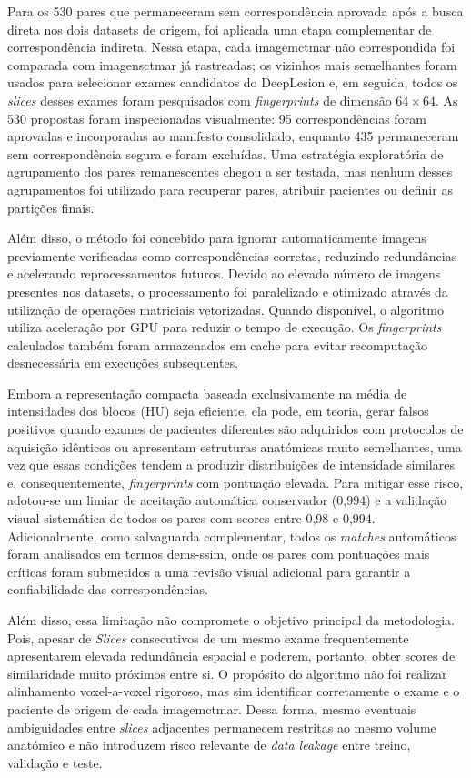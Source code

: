 Para os 530 pares que permaneceram sem correspondência aprovada após a busca direta nos dois datasets de origem, foi aplicada uma etapa complementar de correspondência indireta. Nessa etapa, cada imagem\acrshort{ctmar} não correspondida foi comparada com imagens\acrshort{ctmar} já rastreadas; os vizinhos mais semelhantes foram usados para selecionar exames candidatos do DeepLesion e, em seguida, todos os \textit{slices} desses exames foram pesquisados com \textit{fingerprints} de dimensão $64\times64$. As 530 propostas foram inspecionadas visualmente: 95 correspondências foram aprovadas e incorporadas ao manifesto consolidado, enquanto 435 permaneceram sem correspondência segura e foram excluídas. Uma estratégia exploratória de agrupamento dos pares remanescentes chegou a ser testada, mas nenhum desses agrupamentos foi utilizado para recuperar pares, atribuir pacientes ou definir as partições finais.

Além disso, o método foi concebido para ignorar automaticamente imagens previamente verificadas como correspondências corretas, reduzindo redundâncias e acelerando reprocessamentos futuros.
Devido ao elevado número de imagens presentes nos datasets, o processamento foi paralelizado e otimizado através da utilização de operações matriciais vetorizadas. Quando disponível, o algoritmo utiliza aceleração por GPU para reduzir o tempo de execução. Os \textit{fingerprints} calculados também foram armazenados em cache para evitar recomputação desnecessária em execuções subsequentes.

Embora a representação compacta baseada exclusivamente na média de intensidades dos blocos (HU) seja eficiente, ela pode, em teoria, gerar falsos positivos quando exames de pacientes diferentes são adquiridos com protocolos de aquisição idênticos ou apresentam estruturas anatómicas muito semelhantes, uma vez que essas condições tendem a produzir distribuições de intensidade similares e, consequentemente, \textit{fingerprints} com pontuação elevada. Para mitigar esse risco, adotou‑se um limiar de aceitação automática conservador (0,994) e a validação visual sistemática de todos os pares com scores entre 0,98 e 0,994. Adicionalmente, como salvaguarda complementar, todos os \textit{matches} automáticos foram analisados em termos de\acrshort{ms-ssim}, onde os pares com pontuações mais críticas foram submetidos a uma revisão visual adicional para garantir a confiabilidade das correspondências. 

Além disso, essa limitação não compromete o objetivo principal da metodologia. Pois, apesar de \textit{Slices} consecutivos de um mesmo exame frequentemente apresentarem elevada redundância espacial e poderem, portanto, obter scores de similaridade muito próximos entre si. O propósito do algoritmo não foi realizar alinhamento voxel-a-voxel rigoroso, mas sim identificar corretamente o exame e o paciente de origem de cada imagem\acrshort{ctmar}. Dessa forma, mesmo eventuais ambiguidades entre \textit{slices} adjacentes permanecem restritas ao mesmo volume anatómico e não introduzem risco relevante de \textit{data leakage} entre treino, validação e teste. 

